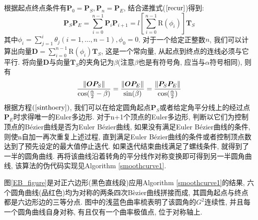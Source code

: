 \documentclass[utf8]{ctexart} %
\begin{document}
		根据起点终点条件有$\boldsymbol{P}_0=\boldsymbol{P}_S, \boldsymbol{P}_n = \boldsymbol{P}_E$, 结合递推式($\ref{recur}$)得到:
		\begin{equation}
			\boldsymbol{P}_S\boldsymbol{P}_E = \sum_{i=0}^{n-1}\boldsymbol{P}_i\boldsymbol{P}_{i+1} = l[\sum_{i=0}^{n-1}\text{R}(\phi_i)]\boldsymbol{T}_S
		\end{equation}
		其中$\phi_i=\sum_{j=1}^i\theta_j (i = 1,\dots,n-1), \phi_0 = 0$. 对于一个给定正整数$n$, 我们可以计算出向量$\boldsymbol{D} = \sum_{i=0}^{n-1}\text{R}(\phi_i)\boldsymbol{T}_S$, 这是一个常向量, 从起点到终点的连线必须与它平行. 将向量$\boldsymbol{D}$与向量$\boldsymbol{T}_S$的夹角记为$\beta$(注意$\beta$也是有符号角, 应当与$\alpha$符号相同), 则有
		\begin{equation}\label{sinthoery}
			\frac{\Arrowvert\boldsymbol{OP}_S\Arrowvert}{\cos(\frac{\alpha}2-\beta)}=\frac{\Arrowvert\boldsymbol{OP}_E\Arrowvert}{\sin(\beta)}=\frac{\Arrowvert\boldsymbol{P}_S\boldsymbol{P}_E\Arrowvert}{\cos(\frac{\alpha}2)}
		\end{equation}
		根据方程$(\ref{sinthoery})$, 我们可以在给定圆角起点$\boldsymbol{P}_S$或者给定角平分线上的经过点$\boldsymbol{P}_E$时求得唯一的Euler多边形. 对于n+1个顶点的Euler多边形, 判断以它们为控制顶点的B\'{e}zier曲线是否为Euler B\'{e}zier曲线, 如果没有满足Euler B\'{e}zier曲线的条件, 则使n自加一再次重复上述过程, 直到满足Euler B\'{e}zier曲线的条件或者控制顶点数达到了预先设定的最大值停止迭代. 如果迭代结束曲线满足了螺线条件, 就得到了一半的圆角曲线. 再将该曲线沿着转角的平分线作对称变换即可得到另一半圆角曲线, 该算法的伪代码实现见Algorithm \ref{smoothcurve1}.\par 
		图\ref{EB_figure}是对正六边形(黑色直线段)应用Algorithm \ref{smoothcurve1}的结果, 六个圆角曲线(品红色)均为对称的两条四次B\`ezier曲线拼接而成, 其圆角起点与终点都是六边形边的三等分点. 图中的浅蓝色曲率梳表明了该圆角的$G^2$连续性, 并且每一个圆角曲线自身对称, 有且仅有一个曲率极值点, 位于对称轴上.
		\IncMargin{1em}
\end{document}
